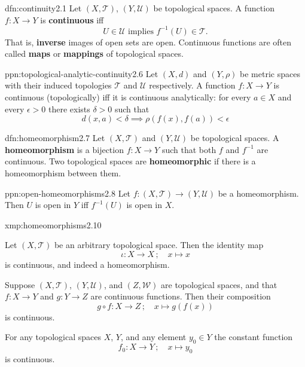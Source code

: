 \documentclass[landscape, 8pt]{extarticle}
\begin{document}
\begin{multicols}{3}
\begin{dfn}[Continuity]{dfn:continuity}{2.1}
	Let $(X, \mathcal{T})$, $(Y, \mathcal{U})$ be topological spaces. A function $f : X \to Y$ is \textbf{continuous} iff
	\[U \in \mathcal{U} \text{ implies } f^{-1}(U) \in \mathcal{T}.\]
	That is, \textbf{inverse} images of open sets are open. Continuous functions are often called \textbf{maps} or \textbf{mappings} of topological spaces.
\end{dfn}

\begin{ppn}{ppn:topological-analytic-continuity}{2.6}
	Let $(X, d)$ and $(Y, \rho)$ be metric spaces with their induced topologies $\mathcal{T}$ and $\mathcal{U}$ respectively. A function $f: X \to Y $ is continuous (topologically) iff it is continuous analytically: for every $a\in X$ and every $\epsilon > 0$ there exists $\delta > 0$ such that
	\[d(x, a) < \delta \implies \rho(f(x), f(a)) < \epsilon\]
\end{ppn}

\begin{dfn}[Homeomorphism]{dfn:homeomorphism}{2.7}
	Let $(X, \mathcal{T})$ and $(Y, \mathcal{U})$ be topological spaces. A \textbf{homeomorphism} is a bijection $f: X \to Y$ such that both $f$ and $f^{-1}$ are continuous. Two topological spaces are \textbf{homeomorphic} if there is a homeomorphism between them.
\end{dfn}

\begin{ppn}{ppn:open-homeomorphisms}{2.8}
	Let $f : (X, \mathcal{T}) \to (Y, \mathcal{U})$ be a homeomorphism. Then $U$ is open in $Y$ iff $f^{-1}(U)$ is open in $X$.
\end{ppn}


\begin{xmp}{xmp:homeomorphisms}{2.10}
\begin{enumerate-tight}
\item Let $(X, \mathcal{T})$ be an arbitrary topological space. Then the identity map
\[\iota : X \to X \,;\quad x \mapsto x\]
is continuous, and indeed a homeomorphism.
\item Suppose $(X, \mathcal{T})$, $(Y, \mathcal{U})$, and $(Z, \mathcal{W})$ are topological spaces, and that $f : X \to Y$ and $g : Y \to Z$ are continuous functions. Then their composition
\[g \circ f : X \to Z \,; \quad x \mapsto g(f(x))\]
is continuous.
\item For any topological spaces $X$, $Y$, and any element $y_{0} \in Y$ the constant function
\[f_{0} : X \to Y \,; \quad x \mapsto y_{0}\]
is continuous.
\end{enumerate-tight}
\end{xmp}


\end{multicols}
\end{document}
